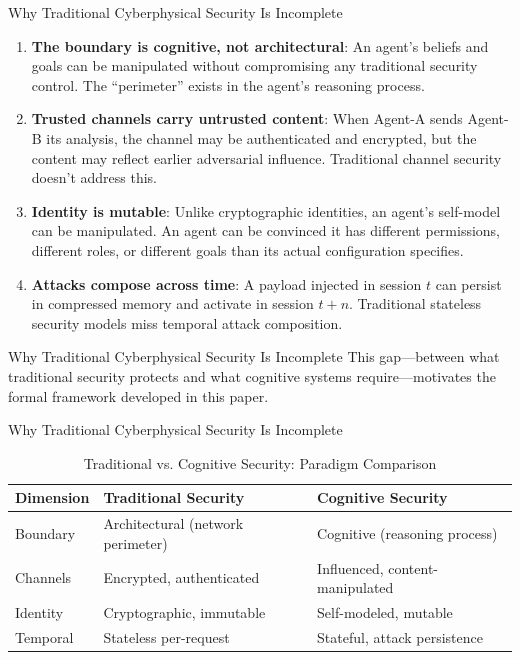 \documentclass[
  ignorenonframetext,
]{beamer}
\begin{document}
\begin{frame}[allowframebreaks]{Why Traditional Cyberphysical Security
Is Incomplete}
\begin{enumerate}
\item \textbf{The boundary is cognitive, not architectural}: An agent's beliefs and goals can be manipulated without compromising any traditional security control. The ``perimeter'' exists in the agent's reasoning process.

\item \textbf{Trusted channels carry untrusted content}: When Agent-A sends Agent-B its analysis, the channel may be authenticated and encrypted, but the content may reflect earlier adversarial influence. Traditional channel security doesn't address this.

\item \textbf{Identity is mutable}: Unlike cryptographic identities, an agent's self-model can be manipulated. An agent can be convinced it has different permissions, different roles, or different goals than its actual configuration specifies.

\item \textbf{Attacks compose across time}: A payload injected in session $t$ can persist in compressed memory and activate in session $t+n$. Traditional stateless security models miss temporal attack composition.
\end{enumerate}

\end{frame}

\begin{frame}[allowframebreaks]{Why Traditional Cyberphysical Security
Is Incomplete}
This gap---between what traditional security protects and what cognitive
systems require---motivates the formal framework developed in this
paper.

\end{frame}

\begin{frame}[allowframebreaks]{Why Traditional Cyberphysical Security
Is Incomplete}
\begin{table}[htbp]
\centering
\caption{Traditional vs. Cognitive Security: Paradigm Comparison}
\label{tab:security-comparison}
\begin{tabular}{@{}lll@{}}
\toprule
Dimension & Traditional Security & Cognitive Security \\
\midrule
Boundary & Architectural (network perimeter) & Cognitive (reasoning process) \\
Channels & Encrypted, authenticated & Influenced, content-manipulated \\
Identity & Cryptographic, immutable & Self-modeled, mutable \\
Temporal & Stateless per-request & Stateful, attack persistence \\
\bottomrule
\end{tabular}
\end{table}
\end{frame}
\end{document}
